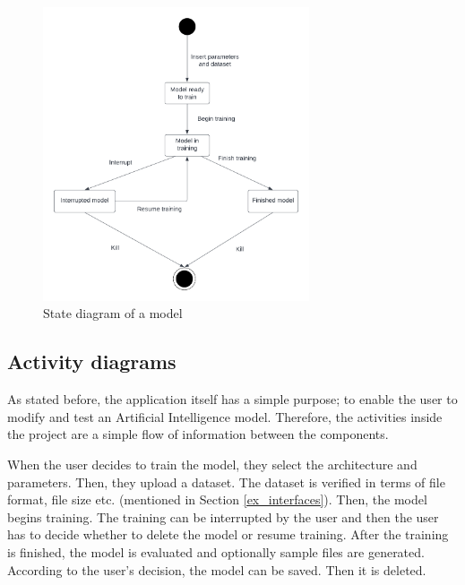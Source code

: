\documentclass{article}
\begin{document}
\begin{figure}[H]
    \centering
    \includegraphics[width=0.7\textwidth]{statediagram.png}
    \caption{State diagram of a model}
\end{figure}

\subsection{Activity diagrams}

As stated before, the application itself has a simple purpose; to enable the user to modify and test an Artificial Intelligence model. Therefore, the activities inside the project are a simple flow of information between the components.

When the user decides to train the model, they select the architecture and parameters. Then, they upload a dataset. The dataset is verified in terms of file format, file size etc. (mentioned in Section \ref{ex_interfaces}). Then, the model begins training. The training can be interrupted by the user and then the user has to decide whether to delete the model or resume training. After the training is finished, the model is evaluated and optionally sample files are generated. According to the user's decision, the model can be saved. Then it is deleted.
\end{document}
